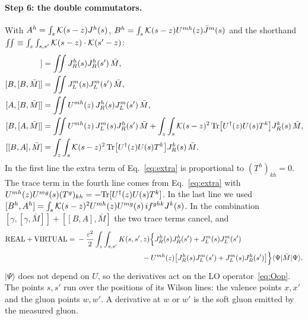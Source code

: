 \paragraph*{Step 6: the double commutators.} With $A^h=\int_s\mathcal{K}(s-z)J^h(s)$, $B^h=\int_s\mathcal{K}(s-z)U^{mh}(z)\bar J^m(s)$ and the shorthand $\iint\equiv\int_z\int_{s,s'}\mathcal{K}(s-z)\cdot\mathcal{K}(s'-z)$:
\begin{align}
[A,[A,\bar M]]&=\iint J_R^h(s)J_R^h(s')\,\bar M,\\
[B,[B,\bar M]]&=\iint J_L^m(s)J_L^m(s')\,\bar M,\\
[A,[B,\bar M]]&=\iint U^{mh}(z)\,J_R^h(s)J_L^m(s')\,\bar M,\\
[B,[A,\bar M]]&=\iint U^{mh}(z)\,J_L^m(s)J_R^h(s')\,\bar M+\int_z\int_s\KK(s-z)^2\,\Tr\big[\Ud(z)U(s)T^k\big]J_R^k(s)\,\bar M,\\
[[B,A],\bar M]&=\int_z\int_s\KK(s-z)^2\,\Tr\big[\Ud(z)U(s)T^k\big]J_R^k(s)\,\bar M.
\end{align}
In the first line the extra term of Eq.~\eqref{eq:extra} is proportional to $(T^h)_{kh}=0$. The trace term in the fourth line comes from Eq.~\eqref{eq:extra} with $U^{mh}(z)U^{mg}(s)(T^g)_{kh}=-\mathrm{Tr}[U^{\dagger}(z)U(s)T^k]$. In the last line we used $[B^h,A^h]=\int_s\mathcal{K}(s-z)^2U^{mh}(z)U^{mg}(s)\,if^{ghk}J^k(s)$. In the combination $[\gamma,[\gamma,\bar M]]+[[B,A],\bar M]$ the two trace terms cancel, and
\begin{align}
\text{REAL}+\text{VIRTUAL}={}&-\frac{\varepsilon^2}{2}\int_z\int_{s,s'}K(s,s',z)\Big\{J_R^h(s)J_R^h(s')+J_L^m(s)J_L^m(s')\notag\\
&\hspace{9em}-U^{mh}(z)\big[J_R^h(s)J_L^m(s')+J_L^m(s)J_R^h(s')\big]\Big\}\langle\Psi|\bar M|\Psi\rangle .
\label{eq:HLR}
\end{align}
$|\Psi\rangle$ does not depend on $U$, so the derivatives act on the LO operator~\eqref{eq:Oop}. The points $s,s'$ run over the positions of its Wilson lines: the valence points $x,x'$ and the gluon points $w,w'$. A derivative at $w$ or $w'$ is the soft gluon emitted by the measured gluon.

